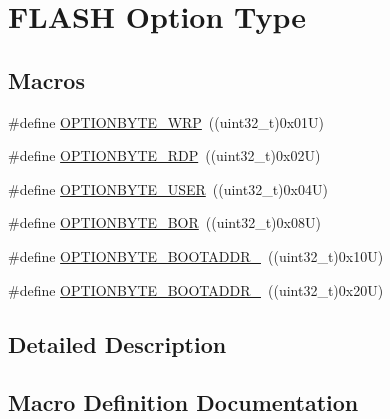 \hypertarget{group___f_l_a_s_h_ex___option___type}{}\section{F\+L\+A\+SH Option Type}
\label{group___f_l_a_s_h_ex___option___type}
\subsection*{Macros}
\begin{DoxyCompactItemize}
\item 
\#define \mbox{\hyperlink{group___f_l_a_s_h_ex___option___type_ga48712a166ea192ddcda0f2653679f9ec}{O\+P\+T\+I\+O\+N\+B\+Y\+T\+E\+\_\+\+W\+RP}}~((uint32\+\_\+t)0x01\+U)
\item 
\#define \mbox{\hyperlink{group___f_l_a_s_h_ex___option___type_ga8f0bdb21ef13bae39d5d8b6619e2df06}{O\+P\+T\+I\+O\+N\+B\+Y\+T\+E\+\_\+\+R\+DP}}~((uint32\+\_\+t)0x02\+U)
\item 
\#define \mbox{\hyperlink{group___f_l_a_s_h_ex___option___type_gac7d843e666e15c79688a1914e8ffe7a5}{O\+P\+T\+I\+O\+N\+B\+Y\+T\+E\+\_\+\+U\+S\+ER}}~((uint32\+\_\+t)0x04\+U)
\item 
\#define \mbox{\hyperlink{group___f_l_a_s_h_ex___option___type_gaf4063216c8386467d187663190936c07}{O\+P\+T\+I\+O\+N\+B\+Y\+T\+E\+\_\+\+B\+OR}}~((uint32\+\_\+t)0x08\+U)
\item 
\#define \mbox{\hyperlink{group___f_l_a_s_h_ex___option___type_ga03ee3781fbf2279180d834686d0a7da2}{O\+P\+T\+I\+O\+N\+B\+Y\+T\+E\+\_\+\+B\+O\+O\+T\+A\+D\+D\+R\+\_}}~((uint32\+\_\+t)0x10\+U)
\item 
\#define \mbox{\hyperlink{group___f_l_a_s_h_ex___option___type_gaca9eaa745fec9591ebe3b2b06feffa18}{O\+P\+T\+I\+O\+N\+B\+Y\+T\+E\+\_\+\+B\+O\+O\+T\+A\+D\+D\+R\+\_}}~((uint32\+\_\+t)0x20\+U)
\end{DoxyCompactItemize}


\subsection{Detailed Description}


\subsection{Macro Definition Documentation}
\mbox{\label{group___f_l_a_s_h_ex___option___type_ga03ee3781fbf2279180d834686d0a7da2}} 
